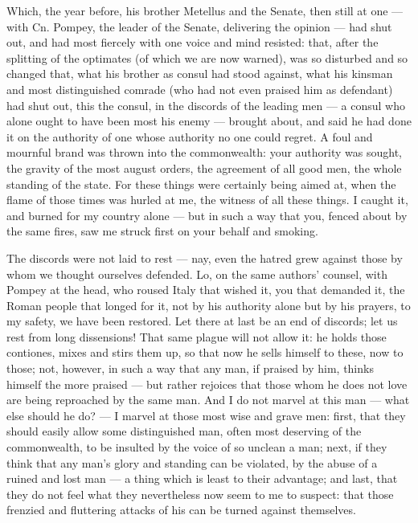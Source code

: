  Which, the year before, his brother Metellus and the Senate, then still at one --- with Cn. Pompey, the leader of the Senate, delivering the opinion --- had shut out, and had most fiercely with one voice and mind resisted: that, after the splitting of the optimates (of which we are now warned), was so disturbed and so changed that, what his brother as consul had stood against, what his kinsman and most distinguished comrade (who had not even praised him as defendant) had shut out, this the consul, in the discords of the leading men --- a consul who alone ought to have been most his enemy --- brought about, and said he had done it on the authority of one whose authority no one could regret. A foul and mournful brand was thrown into the commonwealth: your authority was sought, the gravity of the most august orders, the agreement of all good men, the whole standing of the state. For these things were certainly being aimed at, when the flame of those times was hurled at me, the witness of all these things. I caught it, and burned for my country alone --- but in such a way that you, fenced about by the same fires, saw me struck first on your behalf and smoking.

 The discords were not laid to rest --- nay, even the hatred grew against those by whom we thought ourselves defended. Lo, on the same authors' counsel, with Pompey at the head, who roused Italy that wished it, you that demanded it, the Roman people that longed for it, not by his authority alone but by his prayers, to my safety, we have been restored. Let there at last be an end of discords; let us rest from long dissensions! That same plague will not allow it: he holds those contiones, mixes and stirs them up, so that now he sells himself to these, now to those; not, however, in such a way that any man, if praised by him, thinks himself the more praised --- but rather rejoices that those whom he does not love are being reproached by the same man. And I do not marvel at this man --- what else should he do? --- I marvel at those most wise and grave men: first, that they should easily allow some distinguished man, often most deserving of the commonwealth, to be insulted by the voice of so unclean a man; next, if they think that any man's glory and standing can be violated, by the abuse of a ruined and lost man --- a thing which is least to their advantage; and last, that they do not feel what they nevertheless now seem to me to suspect: that those frenzied and fluttering attacks of his can be turned against themselves.

